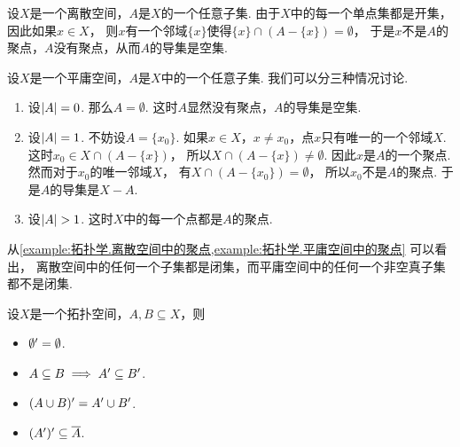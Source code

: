 \begin{example}[离散空间中的聚点]\label{example:拓扑学.离散空间中的聚点}
设\(X\)是一个离散空间，\(A\)是\(X\)的一个任意子集.
由于\(X\)中的每一个单点集都是开集，因此如果\(x \in X\)，
则\(x\)有一个邻域\(\{x\}\)使得\(\{x\}\cap(A-\{x\})=\emptyset\)，
于是\(x\)不是\(A\)的聚点，\(A\)没有聚点，从而\(A\)的导集是空集.
\end{example}

\begin{example}[平庸空间中的聚点]\label{example:拓扑学.平庸空间中的聚点}
设\(X\)是一个平庸空间，\(A\)是\(X\)中的一个任意子集.
我们可以分三种情况讨论.
\begin{enumerate}
	\item 设\(\abs{A} = 0\).
	那么\(A = \emptyset\).
	这时\(A\)显然没有聚点，\(A\)的导集是空集.

	\item 设\(\abs{A} = 1\).
	不妨设\(A = \{x_0\}\).
	如果\(x \in X\)，\(x \neq x_0\)，点\(x\)只有唯一的一个邻域\(X\).
	这时\(x_0 \in X \cap (A - \{x\})\)，
	所以\(X \cap (A - \{x\}) \neq \emptyset\).
	因此\(x\)是\(A\)的一个聚点.
	然而对于\(x_0\)的唯一邻域\(X\)，
	有\(X \cap (A - \{x_0\}) = \emptyset\)，
	所以\(x_0\)不是\(A\)的聚点.
	于是\(A\)的导集是\(X - A\).

	\item 设\(\abs{A} > 1\).
	这时\(X\)中的每一个点都是\(A\)的聚点.
\end{enumerate}
\end{example}

\begin{remark}
从\cref{example:拓扑学.离散空间中的聚点,example:拓扑学.平庸空间中的聚点} 可以看出，
离散空间中的任何一个子集都是闭集，而平庸空间中的任何一个非空真子集都不是闭集.
\end{remark}

\begin{theorem}
设\(X\)是一个拓扑空间，\(A,B \subseteq X\)，则
\begin{itemize}
	\item \(\emptyset' = \emptyset\).
	\item \(A \subseteq B \implies A' \subseteq B'\).
	\item \((A \cup B)' = A' \cup B'\).
	\item \((A')' \subseteq \overline{A}\).
\end{itemize}
\end{theorem}

